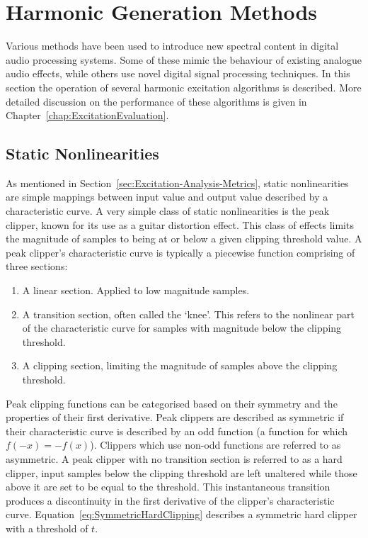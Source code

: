 \section{Harmonic Generation Methods}
\label{sec:Excitation-Methods}
	Various methods have been used to introduce new spectral content in digital audio processing systems.  Some of
	these mimic the behaviour of existing analogue audio effects, while others use novel digital signal processing
	techniques. In this section the operation of several harmonic excitation algorithms is described. More detailed
	discussion on the performance of these algorithms is given in Chapter~\ref{chap:ExcitationEvaluation}.

	\subsection{Static Nonlinearities}
	\label{sec:Excitation-Methods-Statics}
		As mentioned in Section~\ref{sec:Excitation-Analysis-Metrics}, static nonlinearities are simple mappings
		between input value and output value described by a characteristic curve. A very simple class of static
		nonlinearities is the peak clipper, known for its use as a guitar distortion effect. This class of effects
		limits the magnitude of samples to being at or below a given clipping threshold value. A peak clipper's
		characteristic curve is typically a piecewise function comprising of three sections:

		\begin{enumerate}
			\item A linear section. Applied to low magnitude samples.
			\item A transition section, often called the `knee'. This refers to the nonlinear part of the
				characteristic curve for samples with magnitude below the clipping threshold.
			\item A clipping section, limiting the magnitude of samples above the clipping threshold.
		\end{enumerate}
		
		Peak clipping functions can be categorised based on their symmetry and the properties of their first
		derivative. Peak clippers are described as symmetric if their characteristic curve is described by an odd
		function (a function for which $f(-x) = -f(x)$). Clippers which use non-odd functions are referred to as
		asymmetric. A peak clipper with no transition section is referred to as a hard clipper, input samples below
		the clipping threshold are left unaltered while those above it are set to be equal to the threshold. This
		instantaneous transition produces a discontinuity in the first derivative of the clipper's characteristic
		curve. Equation~\ref{eq:SymmetricHardClipping} describes a symmetric hard clipper with a threshold of $t$.

